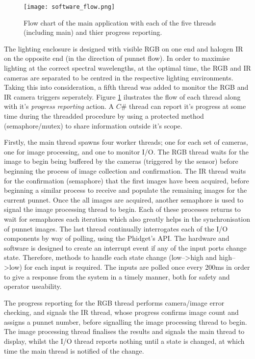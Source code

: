 \documentclass[fleqn,twoside]{article}
\begin{document}
\begin{figure}[h!]
	\centering
	\texttt{[image: software\_flow.png]}
	\caption{Flow chart of the main application with each of the five threads (including main) and thier progress reporting.}
	\label{fig:software_flow}
\end{figure} 


The lighting enclosure is designed with visible RGB on one end and halogen IR on the opposite end (in the direction of punnet flow). In order to maximise lighting at the correct spectral wavelengths, at the optimal time, the RGB and IR cameras are separated to be centred in the respective lighting environments. Taking this into consideration, a fifth thread was added to monitor the RGB and IR camera triggers seperately. Figure \ref{fig:software_flow} ilustrates the flow of each thread along with it's \textit{progress reporting} action. A $C\#$ thread can report it's progress at some time during the threadded procedure by using a protected method (semaphore/mutex) to share information outside it's scope. 

Firstly, the main thread spawns four worker threads; one for each set of cameras, one for image processing, and one to monitor I/O. The RGB thread waits for the image to begin being buffered by the cameras (triggered by the sensor) before beginning the process of image collection and confirmation. The IR thread waits for the confirmation (semaphore) that the first images have been acquired, before beginning a similar process to receive and populate the remaining images for the current punnet. Once the all images are acquired, another semaphore is used to signal the image processing thread to begin. Each of these processes returns to wait for semaphores each iteration which also greatly helps in the synchronisation of punnet images. The last thread continually interrogates each of the I/O components by way of polling, using the Phidget\texttrademark's API. The hardware and software is designed to create an interrupt event if any of the input ports change state. Therefore, methods to handle each state change (low-->high and high-->low) for each input is required. The inputs are polled once every 200ms in order to give a response from the system in a timely manner, both for safety and operator useability.

The progress reporting for the RGB thread performs camera/image error checking, and signals the IR thread, whose progress confirms image count and assigns a punnet number, before signalling the image processing thread to begin. The image processing thread finalises the results and signals the main thread to display, whilst the I/O thread reports nothing until a state is changed, at which time the main thread is notified of the change.
\end{document}
